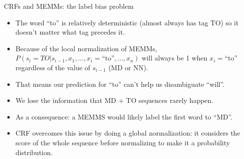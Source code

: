 \documentclass[handout]{beamer}
\begin{document}
\begin{frame}{CRFs and MEMMs: the label bias problem}
\begin{scriptsize}

\begin{itemize}

\item The word ``to'' is relatively deterministic (almost always has tag TO) so it doesn't matter what tag precedes it.

\item Because of the local normalization of MEMMs, $P(s_i = TO | s_{i-1}, x_1, \dots, x_i = \text{``to''}, \dots, x_n)$ will always be 1 when $x_i=$``to'' regardless of the value of $s_{i-1}$ (MD or NN).

\item That means our prediction for ``to'' can't help us disambiguate ``will''.  

\item We lose the information that MD + TO sequences rarely happen.

\item As a consequence: a MEMMS would likely label the first word to ``MD''.

\item CRF overcomes this issue by doing a global normalization: it considers the score of the whole sequence before normalizing to make it a probability distribution.



\end{itemize}

\end{scriptsize}
\end{frame}


\end{document}
